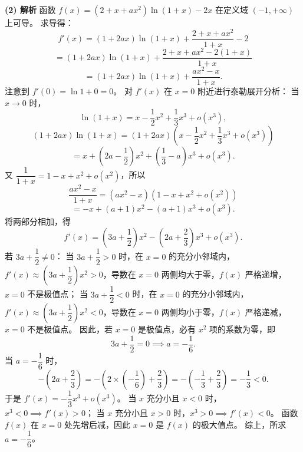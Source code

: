 \begin{answer}
\textbf{(2) 解析} 函数 $f(x) = (2 + x + ax^2)\ln(1 + x) - 2x$ 在定义域 $(-1, +\infty)$ 上可导。
求导得：
\nopagebreak[4]
\[f'(x) = (1 + 2ax)\ln(1 + x) + \dfrac{2 + x + ax^2}{1 + x} - 2\]
\nopagebreak[4]
\[= (1 + 2ax)\ln(1 + x) + \dfrac{2 + x + ax^2 - 2(1 + x)}{1 + x}\]
\nopagebreak[4]
\[= (1 + 2ax)\ln(1 + x) + \dfrac{ax^2 - x}{1 + x}.\]
注意到 $f'(0) = \ln 1 + 0 = 0$。
对 $f'(x)$ 在 $x = 0$ 附近进行泰勒展开分析：
当 $x \to 0$ 时，
\nopagebreak[4]
\[\ln(1 + x) = x - \dfrac12 x^2 + \dfrac13 x^3 + o(x^3),\]
\nopagebreak[4]
\[(1 + 2ax)\ln(1 + x) = (1 + 2ax)\left(x - \dfrac12 x^2 + \dfrac13 x^3 + o(x^3)\right)\]
\nopagebreak[4]
\[= x + \left(2a - \dfrac12\right)x^2 + \left(\dfrac13 - a\right)x^3 + o(x^3).\]
又 $\dfrac{1}{1 + x} = 1 - x + x^2 + o(x^2)$，所以
\nopagebreak[4]
\[\dfrac{ax^2 - x}{1 + x} = (ax^2 - x)(1 - x + x^2 + o(x^2))\]
\nopagebreak[4]
\[= -x + (a + 1)x^2 - (a + 1)x^3 + o(x^3).\]
将两部分相加，得
\nopagebreak[4]
\[f'(x) = \left(3a + \dfrac12\right)x^2 - \left(2a + \dfrac23\right)x^3 + o(x^3).\]
若 $3a + \dfrac12 \neq 0$：
当 $3a + \dfrac12 > 0$ 时，在 $x = 0$ 的充分小邻域内，$f'(x) \approx \left(3a + \dfrac12\right)x^2 > 0$，导数在 $x = 0$ 两侧均大于零，$f(x)$ 严格递增，$x = 0$ 不是极值点；
当 $3a + \dfrac12 < 0$ 时，在 $x = 0$ 的充分小邻域内，$f'(x) \approx \left(3a + \dfrac12\right)x^2 < 0$，导数在 $x = 0$ 两侧均小于零，$f(x)$ 严格递减，$x = 0$ 不是极值点。
因此，若 $x = 0$ 是极值点，必有 $x^2$ 项的系数为零，即
\nopagebreak[4]
\[3a + \dfrac12 = 0 \implies a = -\dfrac16.\]
当 $a = -\dfrac16$ 时，
\nopagebreak[4]
\[-\left(2a + \dfrac23\right) = -\left(2\times\left(-\dfrac16\right) + \dfrac23\right) = -\left(-\dfrac13 + \dfrac23\right) = -\dfrac13 < 0.\]
于是 $f'(x) = -\dfrac13 x^3 + o(x^3)$。
当 $x$ 充分小且 $x < 0$ 时，$x^3 < 0 \implies f'(x) > 0$；
当 $x$ 充分小且 $x > 0$ 时，$x^3 > 0 \implies f'(x) < 0$。
函数 $f(x)$ 在 $x = 0$ 处先增后减，因此 $x = 0$ 是 $f(x)$ 的极大值点。
综上，所求 $a = -\dfrac16$。



\par\medskip

\end{answer}
